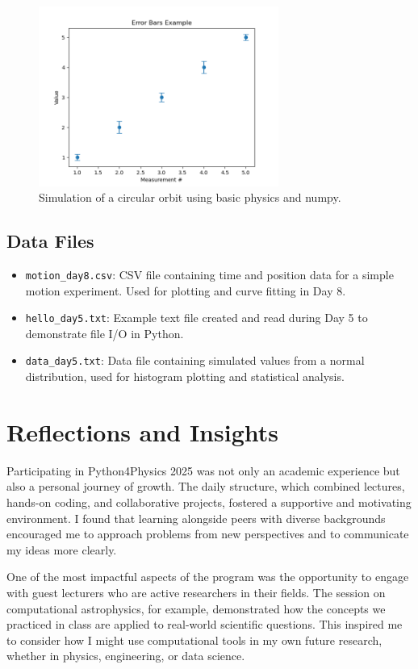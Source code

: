 \documentclass[12pt]{article}
\begin{document}
\begin{figure}[h!]
  \centering
  \includegraphics[width=0.7\textwidth]{../figures/Figure_8.png}
  \caption{Simulation of a circular orbit using basic physics and numpy.}
\end{figure}

\subsection*{Data Files}
\begin{itemize}
  \item \texttt{motion\_day8.csv}: CSV file containing time and position data for a simple motion experiment. Used for plotting and curve fitting in Day 8.
  \item \texttt{hello\_day5.txt}: Example text file created and read during Day 5 to demonstrate file I/O in Python.
  \item \texttt{data\_day5.txt}: Data file containing simulated values from a normal distribution, used for histogram plotting and statistical analysis.
\end{itemize}

\section*{Reflections and Insights}
Participating in Python4Physics 2025 was not only an academic experience but also a personal journey of growth. The daily structure, which combined lectures, hands-on coding, and collaborative projects, fostered a supportive and motivating environment. I found that learning alongside peers with diverse backgrounds encouraged me to approach problems from new perspectives and to communicate my ideas more clearly.

One of the most impactful aspects of the program was the opportunity to engage with guest lecturers who are active researchers in their fields. The session on computational astrophysics, for example, demonstrated how the concepts we practiced in class are applied to real-world scientific questions. This inspired me to consider how I might use computational tools in my own future research, whether in physics, engineering, or data science.
\end{document}
